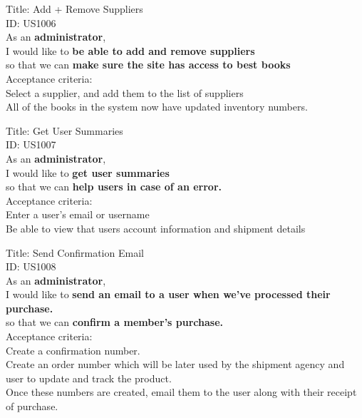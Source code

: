 \documentclass{article}
\begin{document}
\begin{framed}
\noindent
Title: Add + Remove Suppliers \\
ID: US1006 \\
As an \textbf{administrator},\\
 \textbullet  \quad \quad I would like to \textbf{be able to add and remove suppliers}\\ 
 \textbullet  \quad \quad so that we can \textbf{make sure the site has access to best books}\\
 Acceptance criteria: \\
  \textbullet  \quad \quad Select a supplier, and add them to the list of suppliers\\
  \textbullet  \quad \quad All of the books in the system now have updated inventory numbers.
\end{framed}


\begin{framed}
\noindent
Title: Get User Summaries \\
ID: US1007 \\
As an \textbf{administrator},\\
 \textbullet  \quad \quad I would like to \textbf{get user summaries}\\ 
 \textbullet  \quad \quad so that we can \textbf{help users in case of an error.}\\
 Acceptance criteria: \\
  \textbullet  \quad \quad Enter a user's email or username\\
  \textbullet  \quad \quad Be able to view that users account information and shipment details
\end{framed}

\begin{framed}
\noindent
Title: Send Confirmation Email \\
ID: US1008 \\
As an \textbf{administrator},\\
 \textbullet  \quad \quad I would like to \textbf{send an email to a user when we've processed their purchase.}\\ 
 \textbullet  \quad \quad so that we can \textbf{confirm a member's purchase.}\\
 Acceptance criteria: \\
  \textbullet  \quad \quad Create a confirmation number.\\
  \textbullet  \quad \quad Create an order number which will be later used by the shipment agency and user to update and track the product.\\
  \textbullet  \quad \quad Once these numbers are created, email them to the user along with their receipt of purchase.
\end{framed}
\end{document}
